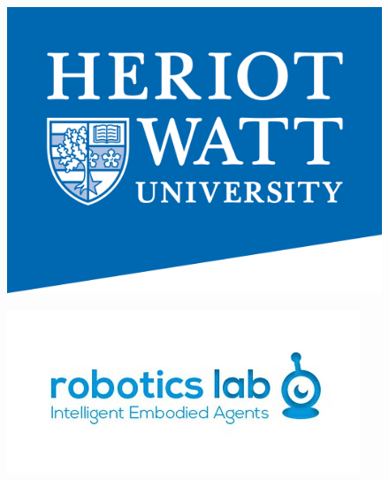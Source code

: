 \documentclass[11pt,a4paper]{article}
\begin{document}
\thispagestyle{empty}
\begin{figure}
\centering
\begin{minipage}{.5\textwidth}
  \centering
  \includegraphics[width=.6\linewidth]{hwlogo}
  \label{fig:test1}
\end{minipage}%
\begin{minipage}{.5\textwidth}
  \centering
  \includegraphics[width=\linewidth]{hwrobotics}
  \label{fig:test2}
\end{minipage}
\end{figure}
\end{document}
